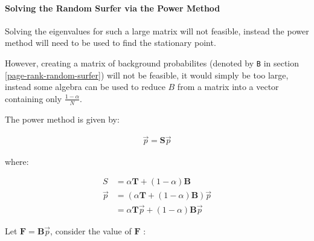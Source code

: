 \documentclass[11pt]{article}
\begin{document}
\paragraph{Solving the Random Surfer via the Power Method}
\label{random-surfer-sparse-fix}
Solving the eigenvalues for such a large matrix will not feasible, instead the power method will need to be used to find the stationary point.

However, creating a matrix of background probabilites (denoted by \texttt{B} in section \ref{page-rank-random-surfer}) will not be feasible, it would simply be too large, instead some algebra can be used to reduce \(B\) from a matrix into a vector containing only \(\frac{1-\alpha}{N}\).

The power method is given by:

\begin{align}
\vec{p}= \mathbf{S} \vec{p}
\end{align}

where:

\begin{align}
S &= \alpha \mathbf{T} +  \left( 1 - \alpha \right) \mathbf{B} \\
\vec{p} &= \left( \alpha \mathbf{T} +  \left( 1 - \alpha \right) \mathbf{B} \right) \vec{p}\\
&= \alpha \mathbf{T}\vec{p} +  \left( 1-\alpha \right) \mathbf{B} \vec{p}
\end{align}

Let \(\mathbf{F}= \mathbf{B}\vec{p}\), consider the value of \(\mathbf{F}\) :
\end{document}
